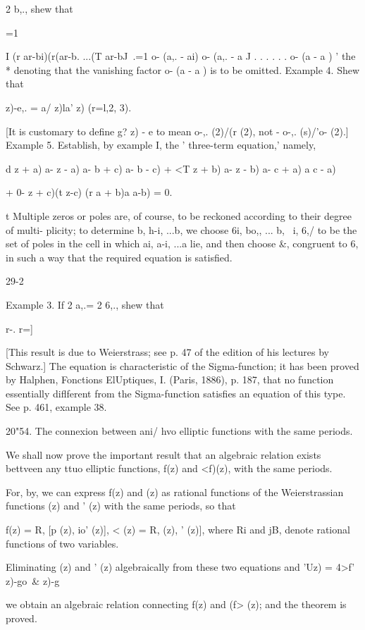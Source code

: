 {2 b,., shew that

=1

I (r ar-bi)(r(ar-b. ...(T ar-bJ \,.=1 o- (a,. - ai) o- (a,. - a J . .
. . . . o- (a - a ) ' the * denoting that the vanishing factor o- (a -
a ) is to be omitted. Example 4. Shew that

  z)-e,. = a/ z)la' z) (r=l,2, 3).

[It is customary to define g? z) - e to mean o-,. (2)/(r (2), not -
o-,. (s)/'o- (2).] Example 5. Establish, by example I, the '
three-term equation,' namely,

d z + a) a- z - a) a- b + c) a- b - c) + <T z + b) a- z - b) a- c + a)
a c - a)

+ 0- z + c)(t z-c) (r a + b)a a-b) = 0.

t Multiple zeros or poles are, of course, to be reckoned according to
their degree of multi- plicity; to determine b, h-i, ...b, we
choose 6i, bo,, ... b, \ i, 6,/ to be the set of poles in the cell
in which ai, a-i, ...a lie, and then choose \&, congruent to 6, in
such a way that the required equation is satisfied.

29-2

Example 3. If 2 a,.= 2 6,., shew that

r-. r=]

%
%

[This result is due to Weierstrass; see p. 47 of the edition of his
lectures by Schwarz.] The equation is characteristic of the
Sigma-function; it has been proved by Halphen, Fonctions ElUptiques,
I. (Paris, 1886), p. 187, that no function essentially diflferent from
the Sigma-function satisfies an equation of this type. See p. 461,
example 38.

20"54. The connexion between ani/ hvo elliptic functions with the same
periods.

We shall now prove the important result that an algebraic relation
exists bettveen any ttuo elliptic functions, f(z) and <f)(z), with the
same periods.

For, by, we can express f(z) and (z) as rational functions of
the Weierstrassian functions (z) and ' (z) with the same periods, so
that

f(z) = R, [p (z), io' (z)], < (z) = R, (z), ' (z)], where Ri and jB,
denote rational functions of two variables.

Eliminating (z) and ' (z) algebraically from these two equations and
'Uz) = 4>f' z)-go\ \& z)-g

we obtain an algebraic relation connecting f(z) and (f> (z); and the
theorem is proved.

}
